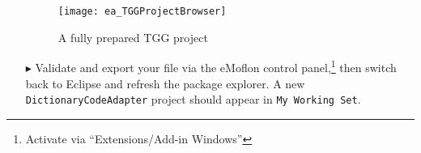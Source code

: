 \begin{itemize}
\vspace{0.5cm}

\begin{figure}[htpb]
\begin{center}
  \texttt{[image: ea\_TGGProjectBrowser]}
  \caption{A fully prepared TGG project}
  \label{ea:TGGProjBrow}
\end{center}
\end{figure}

\item[$\blacktriangleright$] Validate and export your file via the eMoflon control panel,\footnote{Activate via ``Extensions/Add-in Windows''} then switch
back to Eclipse and refresh the package explorer. A new \texttt{Dict\-ion\-ary\-Code\-Adap\-ter} project should appear in \texttt{My Working Set}.


\end{itemize}
